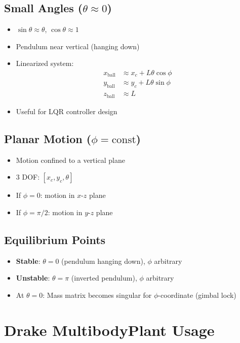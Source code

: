 \documentclass[12pt]{article}
\begin{document}
\subsection{Small Angles ($\theta \approx 0$)}
\begin{itemize}
    \item $\sin\theta \approx \theta$, $\cos\theta \approx 1$
    \item Pendulum near vertical (hanging down)
    \item Linearized system:
    \begin{align}
        x_{\text{ball}} &\approx x_c + L\theta\cos\phi \\
        y_{\text{ball}} &\approx y_c + L\theta\sin\phi \\
        z_{\text{ball}} &\approx L
    \end{align}
    \item Useful for LQR controller design
\end{itemize}

\subsection{Planar Motion ($\phi = \text{const}$)}
\begin{itemize}
    \item Motion confined to a vertical plane
    \item 3 DOF: $[x_c, y_c, \theta]$
    \item If $\phi = 0$: motion in $x$-$z$ plane
    \item If $\phi = \pi/2$: motion in $y$-$z$ plane
\end{itemize}

\subsection{Equilibrium Points}
\begin{itemize}
    \item \textbf{Stable}: $\theta = 0$ (pendulum hanging down), $\phi$ arbitrary
    \item \textbf{Unstable}: $\theta = \pi$ (inverted pendulum), $\phi$ arbitrary
    \item At $\theta = 0$: Mass matrix becomes singular for $\phi$-coordinate (gimbal lock)
\end{itemize}

\section{Drake MultibodyPlant Usage}
\end{document}
